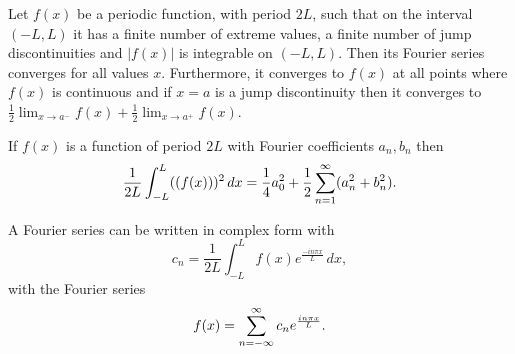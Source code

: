 \documentclass[10pt, a4paper]{article}
\begin{document}
\begin{theorem}
    Let $f(x)$ be a periodic function,
    with period $2L$,
    such that on the interval $(-L, L)$ it has a finite number of extreme values,
    a finite number of jump discontinuities and $|f(x)|$ is integrable on $(-L, L)$.
    Then its Fourier series converges for all values $x$.
    Furthermore,
    it converges to $f(x)$ at all points where $f(x)$ is continuous and if $x = a$ is a jump discontinuity then it converges to $\frac{1}{2}\lim_{x \rightarrow a ^ {-}}f(x) + \frac{1}{2}\lim_{x \rightarrow a ^ {+}}f(x)$.
\end{theorem}

\begin{theorem}
    If $f(x)$ is a function of period $2L$ with Fourier coefficients $a_n, b_n$ then
    \[
    \frac{1}{2L}\int_{-L}^{L}((f(x))) ^ 2\,dx = \frac{1}{4}a_0 ^ 2 + \frac{1}{2}\infsum[n = 1](a_n ^ 2 + b_n ^ 2).
    \]
\end{theorem}

\begin{proposition}
    A Fourier series can be written in complex form with
    \[
    c_n = \frac{1}{2L}\int_{-L}^{L}f(x)e ^ {\frac{-in\pi x}{L}}\,dx,
    \]
    with the Fourier series
    \[
    f(x) = \infsum[n = -\infty]c_ne ^ {\frac{in\pi x}{L}}.
    \]
\end{proposition}
\end{document}
